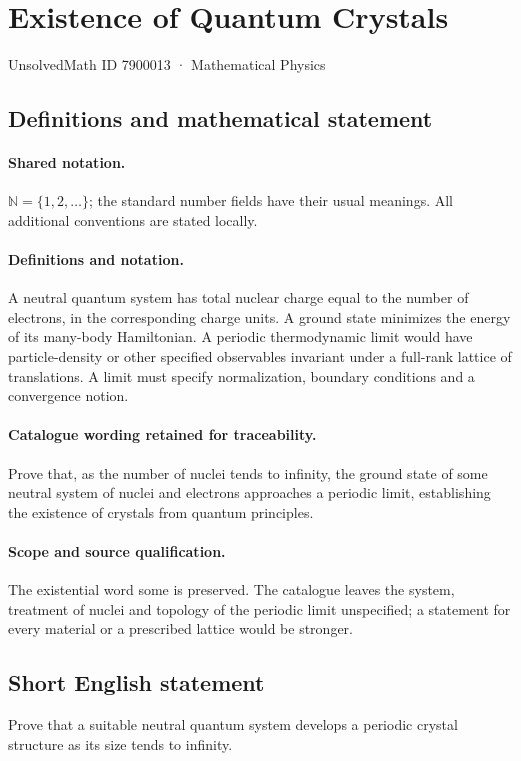 \documentclass[11pt]{article}
\begin{document}
\setcounter{section}{7900012}
\section{Existence of Quantum Crystals}\label{7900013}
{\small UnsolvedMath ID 7900013 · Mathematical Physics}
\subsection{Definitions and mathematical statement}

\paragraph{Shared notation.}$\mathbb N=\{1,2,\ldots\}$; the standard number fields have their usual meanings. All additional conventions are stated locally.


\paragraph{Definitions and notation.}A neutral quantum system has total nuclear charge equal to the number of electrons, in the corresponding charge units. A ground state minimizes the energy of its many-body Hamiltonian. A periodic thermodynamic limit would have particle-density or other specified observables invariant under a full-rank lattice of translations. A limit must specify normalization, boundary conditions and a convergence notion.

\paragraph{Catalogue wording retained for traceability.}
Prove that, as the number of nuclei tends to infinity, the ground state of some neutral system of nuclei and electrons approaches a periodic limit, establishing the existence of crystals from quantum principles.
\paragraph{Scope and source qualification.}The existential word some is preserved. The catalogue leaves the system, treatment of nuclei and topology of the periodic limit unspecified; a statement for every material or a prescribed lattice would be stronger.
\subsection{Short English statement}
Prove that a suitable neutral quantum system develops a periodic crystal structure as its size tends to infinity.
\end{document}
